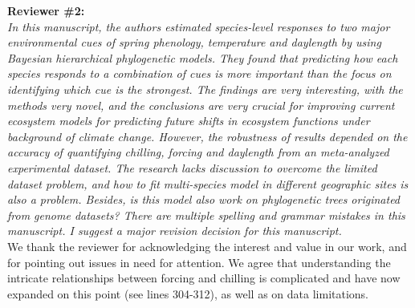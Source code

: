 \documentclass[11pt]{article}
\begin{document}
{\bf Reviewer \#2:}\\


\emph{In this manuscript, the authors estimated species-level responses to two major environmental cues of spring phenology, temperature and daylength by using Bayesian hierarchical phylogenetic models. They found that predicting how each species responds to a combination of cues is more important than the focus on identifying which cue is the strongest. The findings are very interesting, with the methods very novel, and the conclusions are very crucial for improving current ecosystem models for predicting future shifts in ecosystem functions under background of climate change. However, the robustness of results depended on the accuracy of quantifying chilling, forcing and daylength from an meta-analyzed experimental dataset. The research lacks discussion to overcome the limited dataset problem, and how to fit multi-species model in different geographic sites is also a problem. Besides, is this model also work on phylogenetic trees originated from genome datasets? There are multiple spelling and grammar mistakes in this manuscript. I suggest a major revision decision for this manuscript.}\\


We thank the reviewer for acknowledging the interest and value in our work, and for pointing out issues in need for attention. We agree that understanding the intricate relationships between forcing and chilling is complicated and have now expanded on this point (see lines 304-312), as well as on data limitations.\\ 
\end{document}

